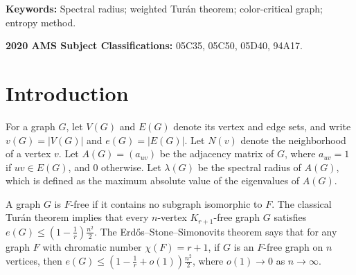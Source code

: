 \documentclass[11pt, a4paper]{article}
\theoremstyle{definition}
\theoremstyle{plain}
\renewcommand{\le}{\leqslant}
\begin{document}
\begin{abstract}
We provide a framework by passing through weighted Tur\'an theorems of independent interest. If $G$ is $F$-free and $\bm{p}$ is a probability vector on $V(G)$ with $\lVert \bm{p}\rVert_\infty$ sufficiently small, then  \vspace{-2mm}
\[ 2\sum_{uv\in E(G)}p_up_v
\le 1-\frac1r + o(1), \vspace{-1mm}  \]
 and the error term $o(1)$ can be
removed if and only if $F$ is color-critical. This is a Motzkin--Straus-type 
inequality in which the clique number of $G$ is replaced by $\chi (F)-1$. The proof of this weighted result combines a blow-up
argument, the graph removal lemma, the
Erd\H{o}s--Simonovits stability theorem, a
probabilistic sampling argument, and an exact
estimate near a complete $r$-partite graph.
 The bridge linking spectral inequalities to weighted inequalities is based on the entropy method for the Markov chain attached to the Perron vector.
\end{abstract}


{\bf Keywords:} Spectral radius; weighted Tur\'an theorem; color-critical graph; entropy method. 

{\bf 2020 AMS Subject Classifications:} 
05C35, 05C50, 05D40, 94A17. 




\section{Introduction}

For a graph $G$, let $V(G)$ and $E(G)$ denote its vertex and edge sets, and write $v(G)=|V(G)|$ and $e(G)=|E(G)|$. Let $N(v)$ denote the neighborhood of a vertex $v$.  Let $A(G)=(a_{uv})$ be the adjacency matrix of $G$, where $a_{uv}=1$ if $uv\in E(G)$, and $0$ otherwise. Let $\lambda(G)$ be the spectral radius of $A(G)$, which is defined as the maximum absolute value of the eigenvalues of $A(G)$. 


A graph $G$ is $F$-free if it contains no subgraph isomorphic to $F$. The  classical Tur\'an theorem \cite{Turan1941} implies that every $n$-vertex $K_{r+1}$-free graph $G$ satisfies $e(G)\le (1- \frac{1}{r})\frac{n^2}{2}$. 
The Erd\H{o}s--Stone--Simonovits theorem \cite{ES1946,ES1966} says that for any graph $F$ with chromatic number $\chi (F)=r+1$, if $G$ is an $F$-free graph on $n$ vertices,  then $e(G)\le \left( 1- \frac{1}{r} + o(1)\right)\frac{n^2}{2}$, where $o(1)\to 0$ as $n\to \infty$.  
\end{document}
